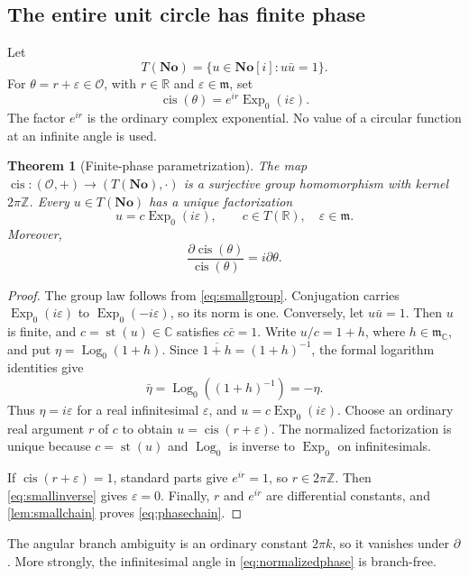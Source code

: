 \documentclass[11pt,a4paper]{article}
\newtheorem{theorem}{Theorem}[section]
\theoremstyle{definition}
\newcommand{\No}{\mathbf{No}}
\newcommand{\SC}{\mathbf{No}[i]}
\newcommand{\R}{\mathbb R}
\newcommand{\C}{\mathbb C}
\newcommand{\Z}{\mathbb Z}
\newcommand{\D}{\partial}
\newcommand{\OO}{\mathcal O}
\newcommand{\mm}{\mathfrak m}
\newcommand{\st}{\operatorname{st}}
\newcommand{\cis}{\operatorname{cis}}
\newcommand{\Expzero}{\operatorname{Exp}_0}
\newcommand{\Logzero}{\operatorname{Log}_0}
\numberwithin{equation}{section}
\begin{document}
\subsection{The entire unit circle has finite phase}
Let
\[
 T(\No)=\{u\in\SC:u\bar u=1\}.
\]
For $\theta=r+\varepsilon\in\OO$, with $r\in\R$ and
$\varepsilon\in\mm$, set
\begin{equation}\label{eq:cis}
 \cis(\theta)=e^{ir}\Expzero(i\varepsilon).
\end{equation}
The factor $e^{ir}$ is the ordinary complex exponential. No value of a
circular function at an infinite angle is used.

\begin{theorem}[Finite-phase parametrization]\label{thm:phase}
The map $\cis:(\OO,+)\to(T(\No),\cdot)$ is a surjective group
homomorphism with kernel $2\pi\Z$. Every $u\in T(\No)$ has a unique
factorization
\begin{equation}\label{eq:normalizedphase}
 u=c\Expzero(i\varepsilon),\qquad
 c\in T(\R),\quad\varepsilon\in\mm.
\end{equation}
Moreover,
\begin{equation}\label{eq:phasechain}
 \frac{\D\cis(\theta)}{\cis(\theta)}=i\D\theta.
\end{equation}
\end{theorem}
\begin{proof}
The group law follows from \eqref{eq:smallgroup}. Conjugation carries
$\Expzero(i\varepsilon)$ to $\Expzero(-i\varepsilon)$, so its norm is
one. Conversely, let $u\bar u=1$. Then $u$ is finite, and
$c=\st(u)\in\C$ satisfies $c\bar c=1$. Write $u/c=1+h$, where
$h\in\mm_\C$, and put $\eta=\Logzero(1+h)$. Since
$\overline{1+h}=(1+h)^{-1}$, the formal logarithm identities give
\[
 \bar\eta=\Logzero((1+h)^{-1})=-\eta.
\]
Thus $\eta=i\varepsilon$ for a real infinitesimal $\varepsilon$, and
$u=c\Expzero(i\varepsilon)$. Choose an ordinary real argument $r$ of
$c$ to obtain $u=\cis(r+\varepsilon)$. The normalized factorization is
unique because $c=\st(u)$ and $\Logzero$ is inverse to $\Expzero$ on
infinitesimals.

If $\cis(r+\varepsilon)=1$, standard parts give $e^{ir}=1$, so
$r\in2\pi\Z$. Then \eqref{eq:smallinverse} gives $\varepsilon=0$.
Finally, $r$ and $e^{ir}$ are differential constants, and
\cref{lem:smallchain} proves \eqref{eq:phasechain}.
\end{proof}
The angular branch ambiguity is an ordinary constant $2\pi k$, so it
vanishes under $\D$. More strongly, the infinitesimal angle in
\eqref{eq:normalizedphase} is branch-free.
\end{document}
